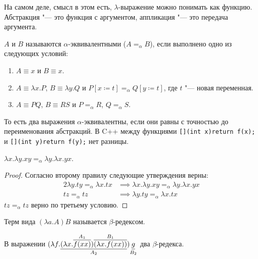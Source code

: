 На самом деле, смысл в этом есть, $\lambda$-выражение можно понимать как функцию.
Абстракция "--- это функция с аргументом, аппликация "--- это передача аргумента.

\begin{definition}
    $A$ и $B$ называются $\alpha$-эквивалентными ($A=_{\alpha}B$), если выполнено одно из следующих условий:
    \begin{enumerate}
        \item $A\equiv{}x$ и $B\equiv{}x$.
        \item $A\equiv{}\lambda{}x.P$, $B\equiv{}\lambda{}y.Q$ и $P [x\coloneqq{}t] =_{\alpha}Q [y\coloneqq{}t]$, где $t$ "--- новая переменная.
        \item $A\equiv{}PQ$, $B\equiv{}RS$ и $P=_{\alpha}R$, $Q=_{\alpha}S$.
    \end{enumerate}
\end{definition}

То есть два выражения $\alpha$-эквивалентны, если они равны с точностью до переименования абстракций.
В C++ между функциями \texttt{[](int x){return f(x);}} и \texttt{[](int y){return f(y);}} нет разницы.

\begin{example}
    $\lambda{}x.\lambda{}y.xy=_{\alpha}\lambda{}y.\lambda{}x.yx$.
    \begin{proof} Согласно второму правилу следующие утверждения верны:
        \begin{alignat*}{2}
            \lambda{}y.ty=_{\alpha}\lambda{}x.tx &\implies \lambda{}x.\lambda{}y.xy=_{\alpha}\lambda{}y.\lambda{}x.yx \\
            tz=_{\alpha}tz &\implies \lambda{}y.ty=_{\alpha}\lambda{}x.tx
        \end{alignat*}%
        $tz=_{\alpha}tz$ верно по третьему условию.
    \end{proof}
\end{example}

\begin{definition}
    Терм вида $\left(\lambda{}a.A\right)B$ называется $\beta$-редексом.
\end{definition}

\begin{example}
    В выражении
    $
        (
            \lambda{}f.
                \underset{A_2}{\underline{
                    (\lambda{}x.\overset{A_1}{\overline{f(xx)}})
                    \overset{B_1}{\overline{(\lambda{}x.f(xx))}}
                }}
        )\underset{B_2}{\underline{g\vphantom{f\left(xx\right)}}}
    $ два $\beta$-редекса.
\end{example}

